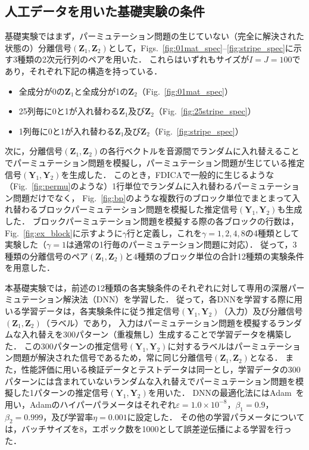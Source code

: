 \subsection{人工データを用いた基礎実験の条件}
\label{sec:ex_condition_matrix}
基礎実験ではまず，パーミュテーション問題の生じていない（完全に解決された状態の）分離信号$(\bm{Z}_1, \bm{Z}_2)$として，Figs.~\ref{fig:01mat_spec}--\ref{fig:stripe_spec}に示す3種類の2次元行列のペアを用いた．
これらはいずれもサイズが$I=J=100$であり，それぞれ下記の構造を持っている．
\begin{itemize}
  \item 全成分が0の$\bm{Z}_1$と全成分が1の$\bm{Z}_2$（Fig.~\ref{fig:01mat_spec}）
  \item 25列毎に0と1が入れ替わる$\bm{Z}_1$及び$\bm{Z}_2$（Fig.~\ref{fig:25stripe_spec}）
  \item 1列毎に0と1が入れ替わる$\bm{Z}_1$及び$\bm{Z}_2$（Fig.~\ref{fig:stripe_spec}）
\end{itemize}
次に，分離信号$(\bm{Z}_1, \bm{Z}_2)$の各行ベクトルを音源間でランダムに入れ替えることでパーミュテーション問題を模擬し，パーミュテーション問題が生じている推定信号$(\bm{Y}_1, \bm{Y}_2)$を生成した．
このとき，FDICAで一般的に生じるような（Fig.~\ref{fig:permu}のような）1行単位でランダムに入れ替わるパーミュテーション問題だけでなく，
Fig.~\ref{fig:bp}のような複数行のブロック単位でまとまって入れ替わるブロックパーミュテーション問題を模擬した推定信号$(\bm{Y}_1, \bm{Y}_2)$も生成した．
ブロックパーミュテーション問題を模擬する際の各ブロックの行数は，Fig.~\ref{fig:ex_block}に示すように$\gamma$行と定義し，これを$\gamma=1, 2, 4, 8$の4種類として実験した（$\gamma=1$は通常の1行毎のパーミュテーション問題に対応）．
従って，3種類の分離信号のペア$(\bm{Z}_1, \bm{Z}_2)$と4種類のブロック単位の合計12種類の実験条件を用意した．

本基礎実験では，前述の12種類の各実験条件のそれぞれに対して専用の深層パーミュテーション解決法（DNN）を学習した．
従って，各DNNを学習する際に用いる学習データは，各実験条件に従う推定信号$(\bm{Y}_1, \bm{Y}_2)$（入力）及び分離信号$(\bm{Z}_1, \bm{Z}_2)$（ラベル）であり，
入力はパーミュテーション問題を模擬するランダムな入れ替えを300パターン（重複無し）生成することで学習データを構築した．
この300パターンの推定信号$(\bm{Y}_1, \bm{Y}_2)$に対するラベルはパーミュテーション問題が解決された信号であるため，常に同じ分離信号$(\bm{Z}_1, \bm{Z}_2)$となる．
また，性能評価に用いる検証データとテストデータは同一とし，学習データの300パターンには含まれていないランダムな入れ替えでパーミュテーション問題を模擬した1パターンの推定信号$(\bm{Y}_1, \bm{Y}_2)$を用いた．
DNNの最適化法にはAdam~\cite{adam}を用い，Adamのハイパーパラメータはそれぞれ$\varepsilon=1.0\times10^{-8}$，$\beta_1 = 0.9$，$\beta_2 = 0.999$，及び学習率$\eta=0.001$に設定した．
その他の学習パラメータについては，バッチサイズを8，エポック数を1000として誤差逆伝播による学習を行った．

